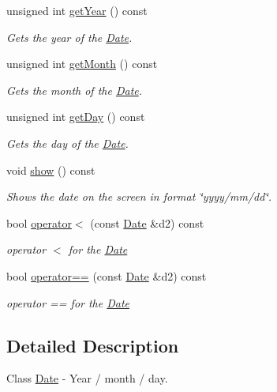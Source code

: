 \begin{DoxyCompactItemize}
unsigned int \hyperlink{class_date_a597b505c264a24d34369c43119fc4e6e}{get\+Year} () const
\begin{DoxyCompactList}\small\item\em Gets the year of the \hyperlink{class_date}{Date}. \end{DoxyCompactList}\item 
unsigned int \hyperlink{class_date_a6152596dcf2e1e78e2095ea518de59e7}{get\+Month} () const
\begin{DoxyCompactList}\small\item\em Gets the month of the \hyperlink{class_date}{Date}. \end{DoxyCompactList}\item 
unsigned int \hyperlink{class_date_a13855b25efb79eaf7dccf08555421a1d}{get\+Day} () const
\begin{DoxyCompactList}\small\item\em Gets the day of the \hyperlink{class_date}{Date}. \end{DoxyCompactList}\item 
void \hyperlink{class_date_a37f8fc7ca1692df7a8b265099c061721}{show} () const
\begin{DoxyCompactList}\small\item\em Shows the date on the screen in format \char`\"{}yyyy/mm/dd\char`\"{}. \end{DoxyCompactList}\item 
bool \hyperlink{class_date_a09704874041e417655bf7be43596da80}{operator$<$} (const \hyperlink{class_date}{Date} \&d2) const
\begin{DoxyCompactList}\small\item\em operator $<$ for the \hyperlink{class_date}{Date} \end{DoxyCompactList}\item 
bool \hyperlink{class_date_ab33fabb71e001e3bb98aa3aff846ea65}{operator==} (const \hyperlink{class_date}{Date} \&d2) const
\begin{DoxyCompactList}\small\item\em operator == for the \hyperlink{class_date}{Date} \end{DoxyCompactList}\end{DoxyCompactItemize}


\subsection{Detailed Description}
Class \hyperlink{class_date}{Date} -\/ Year / month / day. 

